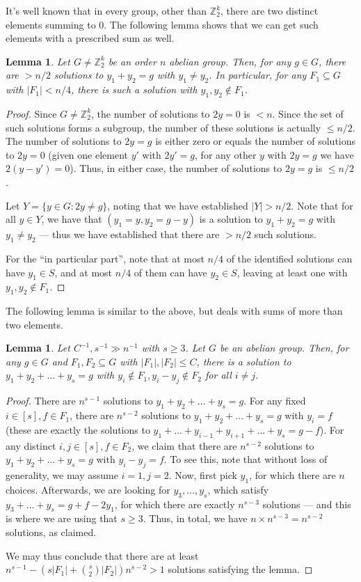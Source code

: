 \documentclass[a4paper,11pt,hidelinks]{amsart}
\newtheorem{lemma}[theorem]{Lemma}
\theoremstyle{definition}
\begin{document}
It's well known that in every group, other than $\mathbb{Z}_2^k$, there are two distinct elements summing to $0$. The following lemma shows that we can get such elements with a prescribed sum as well.
\begin{lemma}\label{Lemma_y1y2_separate}
Let $G\neq \mathbb{Z}_2^k$ be an order $n$ abelian group. Then, for any $g\in G$, there are $> n/2$ solutions to $y_1+y_2=g$ with $y_1\neq y_2$. In particular, for any $F_1\subseteq G$ with $|F_1|< n/4$, there is such a solution with $y_1, y_2\not\in F_1$.
\end{lemma}
\begin{proof}
Since $G\neq \mathbb{Z}_2^k$, the number of solutions to $2y=0$ is $< n$. Since the set of such solutions forms a subgroup, the number of these solutions is actually $\leq n/2$. The number of solutions to $2y=g$ is either zero or equals the number of solutions to $2y=0$ (given one element $y'$ with $2y'=g$, for any other $y$ with $2y=g$ we have $2(y-y')=0$). Thus, in either case, the number of solutions to  $2y=g$ is $\leq n/2$. 

Let $Y=\{y\in G: 2y\neq g\}$, noting that we have established $|Y|> n/2$. Note that for all $y\in Y$, we have that $(y_1=y, y_2=g-y)$ is a solution to $y_1+y_2=g$ with $y_1\neq y_2$ --- thus we have established that there are $>n/2$ such solutions.

For the ``in particular part'', note that at most $n/4$ of the identified solutions can have $y_1\in S$, and at most $n/4$ of them can have $y_2\in S$, leaving at least one with $y_1, y_2\not\in F_1$.
\end{proof}

The following lemma is similar to the above, but deals with sums of more than two elements.
\begin{lemma}\label{Lemma_y1y2...ys_separate}
Let $C^{-1}, s^{-1}\gg n^{-1}$ with $s\geq 3$.
Let $G$ be an abelian group. Then, for any $g\in G$ and $F_1, F_2\subseteq G$ with $|F_1|, |F_2|\leq C$, there is a solution to $y_1+y_2+\dots+y_s=g$ with $y_i\not\in F_1, y_{i}-y_j\not\in F_2$ for all $i\neq j$.
\end{lemma}
\begin{proof}
There are $n^{s-1}$ solutions to $y_1+y_2+\dots+y_s=g$. For any fixed $i\in[s], f\in F_1$, there are $n^{s-2}$ solutions to $y_1+y_2+\dots+y_s=g$ with $y_i=f$ (these are exactly the solutions to $y_1+\dots+y_{i-1}+ y_{i+1}+\dots+y_s=g-f$). For any distinct $i,j\in[s], f\in F_2$, we claim that there are $n^{s-2}$ solutions to $y_1+y_2+\dots+y_s=g$ with $y_i-y_j=f$. To see this, note that without loss of generality, we may assume $i=1,j=2$. Now, first pick $y_1$, for which there are $n$ choices. Afterwards, we are looking for $y_3, \dots, y_s$, which satisfy $y_3+\dots+y_s=g+f-2y_1$, for which there are exactly $n^{s-3}$ solutions --- and this is where we are using that $s\geq 3$. Thus, in total, we have $n\times n^{s-3}=n^{s-2}$ solutions, as claimed. 
\par We may thus conclude that there are at least $n^{s-1}-(s|F_1|+\binom s2|F_2|)n^{s-2}>1$ solutions satisfying the lemma.
\end{proof}
\end{document}
